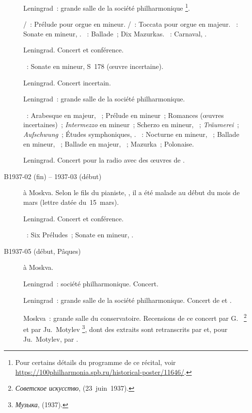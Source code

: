 \begin{description}
 \item[]
 Leningrad~: grande salle de la société philharmonique%
 \footnote{Pour certains détails du programme de ce récital, voir
 \href{https://100philharmonia.spb.ru/historical-poster/11646/}%
 {https://100philharmonia.spb.ru/historical-poster/11646/}.}.

 \textsc{\Buxtehude{}/\Nikolaiev{}}~: Prélude pour orgue en \kF \Sharp
 mineur.
 \textsc{\Pachelbel{}/\Nikolaiev{}}~: Toccata pour orgue en \kF majeur.
 \textsc{\Beethoven{}}~: Sonate en \kF mineur, .
 \textsc{\Chopin{}}~: Ballade~; Dix Mazurkas.
 \textsc{\Schumann{}}~: Carnaval, .
 \item[]
 Leningrad.
 Concert et conférence.

 \textsc{\Liszt{}}~: Sonate en \kB mineur, S~178 (œuvre incertaine).
 \item[]
 Leningrad.
 Concert incertain.
 \item[]
 Leningrad~: grande salle de la société philharmonique.

 \textsc{\Schumann{}}~: Arabesque en \kC majeur, ~; Prélude en \kB
 \Flat mineur~; Romances (œuvres incertaines)~; \emph{Intermezzo} en \kF
 mineur~; Scherzo en \kG mineur,  ~; \emph{Träumerei}~;
 \emph{Aufschwung}~; Études symphoniques, .
 \textsc{\Chopin{}}~: Nocturne en \kC mineur,  ~; Ballade
 en \kF mineur, ~; Ballade en \kA \Flat majeur, ~;
 Mazurka~; Polonaise.
 \item[]
 Leningrad.
 Concert pour la radio avec des œuvres de \Scriabine{}.
 \item[B1937-02 (fin) -- 1937-03 (début)]
 \VSofronitsky{} à Moskva.
 Selon le fils du pianiste, \ASofronitsky{}, il a été malade au début du
 mois de mars (lettre datée du~15~mars).
 \item[]
 Leningrad.
 Concert et conférence.

 \textsc{\Scriabine{}}~: Six Préludes~; Sonate en \kF \Sharp mineur,
 .
 \item[B1937-05 (début, Pâques)]
 \VSofronitsky{} à Moskva.
 \item[]
 Leningrad~: société philharmonique.
 Concert.
 \item[]
 Leningrad~: grande salle de la société philharmonique.
 Concert de \VSofronitsky{} et \VSlivinsky{}.
 \item[]
 Moskva~: grande salle du conservatoire.
 Recensions de ce concert par G.~\Neuhaus{}%
 \footnote{\foreignlanguage{russian}{\emph{Советское искусство}},
  (23~juin~1937).}
 et par Ju.~Motylev%
 \footnote{\foreignlanguage{russian}{\emph{Музыка}},  (1937).},
 dont des extraits sont retranscrits par \citet[p.~428-429]{Milshteyn82a}
 et, pour Ju.~Motylev, par \citet[p.~387]{Nikonovich08}.


\end{description}
